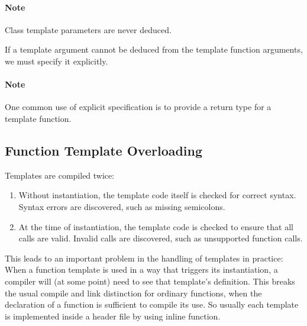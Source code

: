 \documentclass[a4paper,12pt]{book}
\begin{document}
\paragraph{Note} Class template parameters are never deduced.

If a template argument cannot be deduced from the template function arguments, we must specify it explicitly.
\paragraph{Note} One common use of explicit specification is to provide a return type for a template function.
\subsection{Function Template Overloading}
Templates are compiled twice:
\begin{enumerate}
\item Without instantiation, the template code itself is checked for correct syntax. Syntax errors are discovered, such as missing semicolons.
\item At the time of instantiation, the template code is checked to ensure that all calls are valid. Invalid calls are discovered, such as unsupported function calls.

\end{enumerate}
This leads to an important problem in the handling of templates in practice: When a function template is used in a way that triggers its instantiation, a compiler will (at some point) need to see that template's definition. This breaks the usual compile and link distinction for ordinary functions, when the declaration of a function is sufficient to compile its use. So usually each template is implemented inside a header file by using inline function.
\end{document}
